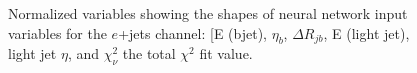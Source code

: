 \begin{figure}[h!]
\vspace{-4.5mm}
\hfil
{}
\caption{Normalized variables showing the shapes of neural network input variables for the $e$+jets channel: [E (bjet), $\eta_b$, $\Delta R_{jb}$, E (light jet), light jet $\eta$, and $\chi^2_\nu$ the total $\chi^2$ fit value.  }
\label{fig:VarPlotsej4}
\end{figure}


